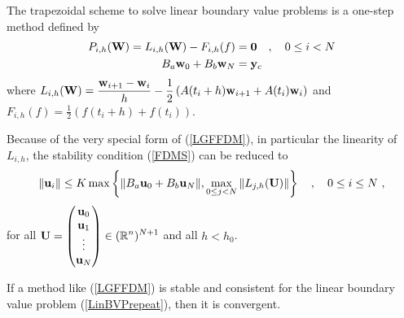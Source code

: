 \begin{egg}
The trapezoidal scheme 
to solve linear boundary value problems is a one-step method defined by
\begin{align*}
P_{i,h}(\mathbf{W}) = L_{i,h}(\mathbf{W}) - F_{i,h}(f) &= \mathbf{0} \quad ,
\quad 0 \leq i < N \\
B_a\mathbf{w}_0 + B_b\mathbf{w}_N &= \mathbf{y}_c
\end{align*}
where
$\displaystyle L_{i,h}(\mathbf{W})
= \frac{\mathbf{w}_{i+1} - \mathbf{w}_i}{h} - \frac{1}{2}
\left( A(t_i+h) \mathbf{w}_{i+1} + A(t_i) \mathbf{w}_i \right)$
and
$\displaystyle F_{i,h}(f) = \frac{1}{2}\left( f(t_i+h) + f(t_i) \right)$.
\label{eggtrapezSchemeLin}
\end{egg}

Because of the very special form of (\ref{LGFFDM}), in particular the
linearity of $L_{i,h}$, the stability condition
(\ref{FDMS}) can be reduced to
\begin{equation} \label{lin_form_FDMS}
\| \mathbf{u}_i \| \leq K
\max \left\{ \| B_a\mathbf{u}_0 + B_b\mathbf{u}_N \| ,
\max_{0\leq j < N} \| L_{j,h}(\mathbf{U}) \|
\right\} \quad , \quad 0 \leq i \leq N \ ,
\end{equation}
for all
$\displaystyle \mathbf{U} = \begin{pmatrix} 
\mathbf{u}_0 \\ \mathbf{u}_1 \\ \vdots \\ \mathbf{u}_N \end{pmatrix}
\in (\mathbb{R}^n)^{N+1}$ and all $h < h_0$.

\begin{prop}
If a method like (\ref{LGFFDM}) is stable and consistent for the
linear boundary value problem (\ref{LinBVPrepeat}), then it is
convergent.
\label{FEMST_C}
\end{prop}

